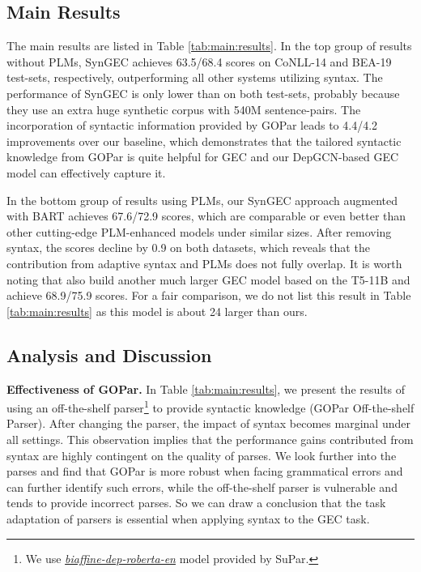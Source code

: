\documentclass[11pt]{article}
\begin{document}
\label{sec:res}
\subsection{Main Results}
The main results are listed in Table \ref{tab:main:results}. 
In the top group of results without PLMs, SynGEC achieves 63.5/68.4  scores on CoNLL-14 and BEA-19 test-sets, respectively, outperforming all other systems utilizing syntax.
The performance of SynGEC is only lower than \citet{stahlberg2021synthetic} on both test-sets, probably because they use an extra huge synthetic corpus with 540M sentence-pairs. The incorporation of syntactic information provided by GOPar leads to 4.4/4.2  improvements 
over our baseline, which demonstrates that the tailored syntactic knowledge from GOPar is quite helpful for GEC and our DepGCN-based GEC model can effectively capture it. 

In the bottom group of results using PLMs, our SynGEC approach augmented with BART achieves 67.6/72.9  scores, which are comparable or even better than other cutting-edge PLM-enhanced models under similar sizes.
After removing syntax, the  scores decline by 0.9 on both datasets, which reveals that the contribution from adaptive syntax and PLMs does not fully overlap. It is worth noting that \citet{rothe2021recipe} also build another much larger GEC model based on the T5-11B \citep{raffel2020exploring} and achieve 68.9/75.9   scores. For a fair comparison, we do not list this result in Table \ref{tab:main:results} as this model is about 24 larger than ours. 









\subsection{Analysis and Discussion}
\label{ref:sec:analysis}




\label{sec:ana}
\textbf{Effectiveness of GOPar.} In Table \ref{tab:main:results}, we present the results of using an off-the-shelf parser\footnote{We use \href{https://github.com/yzhangcs/parser/releases/download/v1.1.0/ptb.biaffine.dep.roberta.zip}{\textit{biaffine-dep-roberta-en}} model provided by SuPar.} 
to provide syntactic knowledge (GOPar  Off-the-shelf Parser). After changing the parser, the impact of syntax becomes marginal under all settings. This observation implies that the performance gains contributed from syntax are highly contingent on the quality of parses. We look further into the parses and find that GOPar is more robust when facing grammatical errors and can further identify such errors, while the off-the-shelf parser is vulnerable and tends to provide incorrect parses. So we can draw a conclusion that the task adaptation of parsers is essential when applying syntax to the GEC task.
\end{document}

